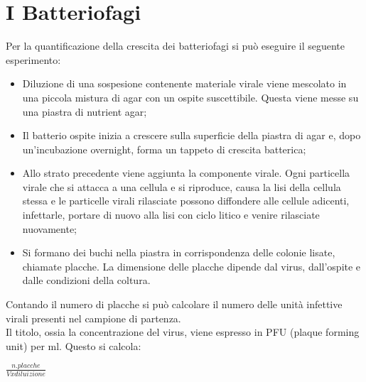 \section{I Batteriofagi}
Per la quantificazione della crescita dei batteriofagi si può eseguire il seguente esperimento:
\begin{itemize}
    \item Diluzione di una sospesione contenente materiale virale viene mescolato in una piccola mistura di agar con un ospite suscettibile. Questa viene messe su una piastra di nutrient agar; 
    \item Il batterio ospite inizia a crescere sulla superficie della piastra di agar e, dopo un'incubazione overnight, forma un tappeto di crescita batterica; 
    \item Allo strato precedente viene aggiunta la componente virale. Ogni particella virale che si attacca a una cellula e si riproduce, causa la lisi della cellula stessa e le particelle virali rilasciate possono diffondere alle cellule adicenti, infettarle, portare di nuovo alla lisi con ciclo litico e venire rilasciate nuovamente;
    \item Si formano dei buchi nella piastra in corrispondenza delle colonie lisate, chiamate placche. La dimensione delle placche dipende dal virus, dall'ospite e dalle condizioni della coltura.
\end{itemize}
Contando il numero di placche si può calcolare il numero delle unità infettive virali presenti nel campione di partenza. 
\\Il titolo, ossia la concentrazione del virus, viene espresso in PFU (plaque forming unit) per ml. Questo si calcola:
\begin{center}
    $\frac{n. placche}{V x diluizione}$
\end{center}
